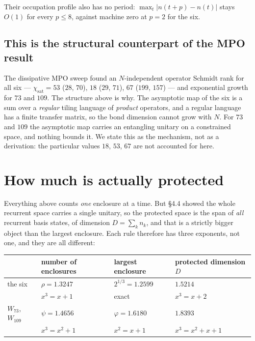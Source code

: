 \documentclass[11pt]{article}
\theoremstyle{plain}
\begin{document}
Their occupation profile also has no period: $\max_t\lvert n(t+p)-n(t)\rvert$
stays $O(1)$ for every $p\le8$, against machine zero at $p=2$ for the six.

\subsection{This is the structural counterpart of the MPO result}

The dissipative MPO sweep found an $N$-independent operator Schmidt rank for all
six --- $\chi_\mathrm{sat}=53$ ($28$, $70$), $18$ ($29$, $71$), $67$ ($199$,
$157$) --- and exponential growth for $73$ and $109$. The structure above is why.
The asymptotic map of the six is a sum over a \emph{regular} tiling language of
\emph{product} operators, and a regular language has a finite transfer matrix, so
the bond dimension cannot grow with $N$. For $73$ and $109$ the asymptotic map
carries an entangling unitary on a constrained space, and nothing bounds it. We
state this as the mechanism, not as a derivation: the particular values $18$,
$53$, $67$ are not accounted for here.

\section{How much is actually protected}

Everything above counts \emph{one} enclosure at a time. But \S4.4 showed the
whole recurrent space carries a single unitary, so the protected space is the
span of \emph{all} recurrent basis states, of dimension $D=\sum_k n_k$, and that
is a strictly bigger object than the largest enclosure. Each rule therefore has
three exponents, not one, and they are all different:

\begin{center}
\begin{tabular}{llll}
\toprule
 & number of enclosures & largest enclosure & protected dimension $D$ \\
\midrule
the six & $\rho=1.3247$ & $2^{1/3}=1.2599$ & $\mathbf{1.5214}$ \\
        & $x^3=x+1$ & exact & $x^3=x+2$ \\[2pt]
$W_{73}$, $W_{109}$ & $\psi=1.4656$ & $\varphi=1.6180$ & $\mathbf{1.8393}$ \\
        & $x^3=x^2+1$ & $x^2=x+1$ & $x^3=x^2+x+1$ \\
\bottomrule
\end{tabular}
\end{center}
\end{document}
